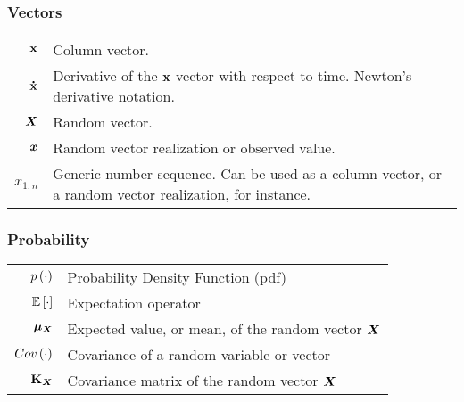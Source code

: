 \documentclass[12pt]{article}
\begin{document}
\subsubsection*{Vectors}
\begin{table}[h]
    \centering
    \begin{tabularx}{\textwidth}{|rX|}
        \hline
         $\boldsymbol{\mathbf{x}}$ & Column vector.\\
         $\boldsymbol{\mathbf{\dot{x}}}$ & Derivative of the $\boldsymbol{\mathbf{x}}$ vector with respect to time. Newton's derivative notation.\\
         ${\boldsymbol{X}}$ & Random vector. \\
         ${\boldsymbol{x}}$ & Random vector realization or observed value. \\
         $x_{1:n}$ & Generic number sequence. Can be used as a column vector, or a random vector realization, for instance.
         \\ \hline
    \end{tabularx}
\end{table}

\subsubsection*{Probability}
\begin{table}[h]
    \centering
    \begin{tabularx}{\textwidth}{|rX|}
        \hline
         $p\left(\cdot\right)$ &     Probability Density Function (pdf) \\
         $\mathbb{E}\left[\cdot\right]$ &   Expectation operator \\
         ${\boldsymbol{\mu_X}}$ &     Expected value, or mean, of the random vector ${\boldsymbol{X}}$ \\
         $\mathop{Cov}\left(\cdot\right)$ &    Covariance of a random variable or vector \\
         $\boldsymbol{\mathbf{K}}_{{\boldsymbol{X}}}$ & Covariance matrix of the random vector ${\boldsymbol{X}}$
         \\ \hline
    \end{tabularx}
\end{table}
\end{document}
